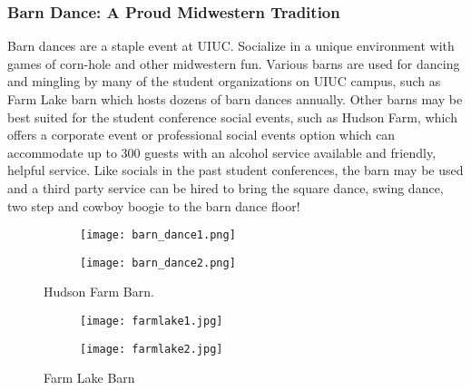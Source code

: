 
\subsubsection{Barn Dance: A Proud Midwestern Tradition}
Barn dances are a staple event at UIUC. Socialize in a unique environment with games of corn-hole and other midwestern fun. Various barns are used for dancing and mingling by many of the student organizations on UIUC campus, such as Farm Lake barn which hosts dozens of barn dances annually. Other barns may be best suited for the student conference social events, such as Hudson Farm, which offers a corporate event or professional social events option which can accommodate up to 300 guests with an alcohol service available and friendly, helpful service. Like socials in the past student conferences, the barn may be used and a third party service can be hired to bring the square dance, swing dance, two step and cowboy boogie to the barn dance floor! 
\vspace{0.5cm}\newline
\begin{figure}[H]
	\centering
	\begin{subfigure}{0.4\textwidth}
		\centering
		\texttt{[image: barn\_dance1.png]}
	\end{subfigure}%
	\begin{subfigure}{0.4\textwidth}
		\centering
		\texttt{[image: barn\_dance2.png]}
	\end{subfigure}	
	\caption{Hudson Farm Barn.}	
\end{figure} 
\begin{figure}[H]
	\centering
	\begin{subfigure}{0.4\textwidth}
		\centering
		\texttt{[image: farmlake1.jpg]}
	\end{subfigure}%
	\begin{subfigure}{0.4\textwidth}
		\centering
		\texttt{[image: farmlake2.jpg]}
	\end{subfigure}	
	\caption{Farm Lake Barn}	
\end{figure} 

